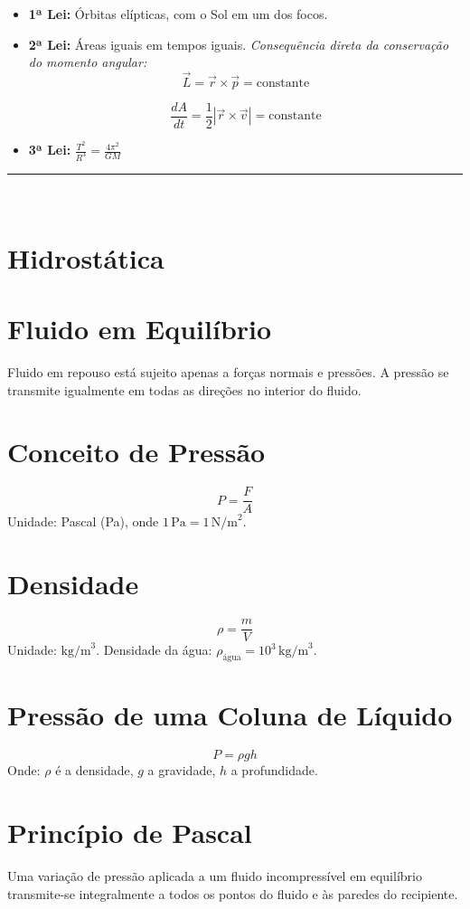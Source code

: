\documentclass[a4paper,12pt]{article}
\begin{document}
\begin{multicols}{2}
\begin{itemize}
  \item \textbf{1ª Lei:} Órbitas elípticas, com o Sol em um dos focos.
  \item \textbf{2ª Lei:} Áreas iguais em tempos iguais. \textit{Consequência direta da 
  conservação do momento angular:}
        \[
        \vec{L} = \vec{r} \times \vec{p} = \text{constante}
        \]

        \[ \frac{dA}{dt} = \frac{1}{2} |\vec{r} \times \vec{v}| = \text{constante} \]

  \item \textbf{3ª Lei:} \( \frac{T^2}{R^3} = \frac{4 \pi^2}{GM}  \)
\end{itemize}

\noindent\rule{\linewidth}{1pt}\\
\section{Hidrostática}

\section{Fluido em Equilíbrio}
Fluido em repouso está sujeito apenas a forças normais e pressões. A pressão se transmite igualmente em todas as direções no interior do fluido.

\section{Conceito de Pressão}
\[
P = \frac{F}{A}
\]
Unidade: Pascal (Pa), onde \(1\, \text{Pa} = 1\, \text{N/m}^2\).

\section{Densidade}
\[
\rho = \frac{m}{V}
\]
Unidade: \(\text{kg/m}^3\). Densidade da água: \(\rho_{\text{água}} = 10^3\, \text{kg/m}^3\).

\section{Pressão de uma Coluna de Líquido}
\[
P = \rho g h
\]
Onde: \(\rho\) é a densidade, \(g\) a gravidade, \(h\) a profundidade.

\section{Princípio de Pascal}
Uma variação de pressão aplicada a um fluido incompressível em equilíbrio transmite-se integralmente a todos os pontos do fluido e às paredes do recipiente.


\end{multicols}
\end{document}
